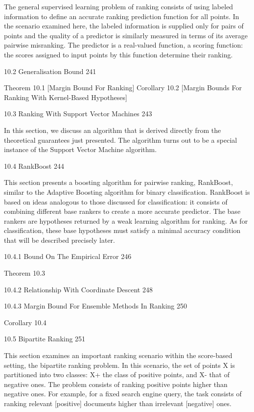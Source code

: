The general supervised learning problem of ranking consists of using labeled information to define an accurate ranking prediction function for all points. In the scenario examined here, the labeled information is supplied only for pairs of points and the quality of a predictor is similarly measured in terms of its average pairwise misranking. The predictor is a real-valued function, a scoring function: the scores assigned to input points by this function determine their ranking.

10.2 Generalisation Bound 241

Theorem 10.1 [Margin Bound For Ranking]
Corollary 10.2 [Margin Bounds For Ranking With Kernel-Based Hypotheses]

10.3 Ranking With Support Vector Machines 243

In this section, we discuss an algorithm that is derived directly from the theoretical guarantees just presented. The algorithm turns out to be a special instance of the Support Vector Machine algorithm.

10.4 RankBoost 244

This section presents a boosting algorithm for pairwise ranking, RankBoost, similar to the Adaptive Boosting algorithm for binary classification. RankBoost is based on ideas analogous to those discussed for classification: it consists of combining different base rankers to create a more accurate predictor. The base rankers are hypotheses returned by a weak learning algorithm for ranking. As for classification, these base hypotheses must satisfy a minimal accuracy condition that will be described precisely later.

10.4.1 Bound On The Empirical Error 246

Theorem 10.3

10.4.2 Relationship With Coordinate Descent 248



10.4.3 Margin Bound For Ensemble Methods In Ranking 250

Corollary 10.4

10.5 Bipartite Ranking 251

This section examines an important ranking scenario within the score-based setting, the bipartite ranking problem. In this scenario, the set of points X is partitioned into two classes: X+ the class of positive points, and X- that of negative ones. The problem consists of ranking positive points higher than negative ones. For example, for a fixed search engine query, the task consists of ranking relevant [positive] documents higher than irrelevant [negative] ones.

